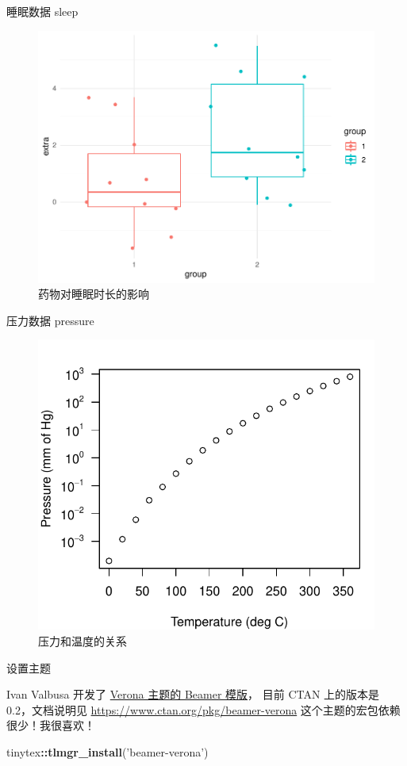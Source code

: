 \documentclass[
  ignorenonframetext,
  UTF8,fontset=adobe,zihao=false]{ctexbeamer}
\newenvironment{Shaded}{\begin{snugshade}}{\end{snugshade}}
\newcommand{\KeywordTok}[1]{\textcolor[rgb]{0.13,0.29,0.53}{\textbf{#1}}}
\newcommand{\NormalTok}[1]{#1}
\newcommand{\OperatorTok}[1]{\textcolor[rgb]{0.81,0.36,0.00}{\textbf{#1}}}
\newcommand{\StringTok}[1]{\textcolor[rgb]{0.31,0.60,0.02}{#1}}
\begin{document}
\begin{frame}{睡眠数据 sleep}
\protect\hypertarget{sec:sleep}{}

\begin{figure}
\includegraphics[width=0.7\linewidth]{beamer-verona_files/figure-beamer/sleep-1} \caption{药物对睡眠时长的影响}\label{fig:sleep}
\end{figure}

\end{frame}

\begin{frame}{压力数据 pressure}
\protect\hypertarget{sec:pressure}{}

\begin{figure}
\includegraphics[width=0.65\linewidth]{beamer-verona_files/figure-beamer/pressure-1} \caption{压力和温度的关系}\label{fig:pressure}
\end{figure}

\end{frame}

\begin{frame}[fragile]{设置主题}
\protect\hypertarget{sec:setup-verona}{}

Ivan Valbusa 开发了 \href{https://bitbucket.org/rivanvx/beamer}{Verona 主题的 Beamer 模版}，
目前 CTAN 上的版本是 0.2，文档说明见 \url{https://www.ctan.org/pkg/beamer-verona}
这个主题的宏包依赖很少！我很喜欢！

\begin{Shaded}
\begin{Highlighting}[]
\NormalTok{tinytex}\OperatorTok{::}\KeywordTok{tlmgr_install}\NormalTok{(}\StringTok{'beamer-verona'}\NormalTok{)}
\end{Highlighting}
\end{Shaded}

\end{frame}
\end{document}
